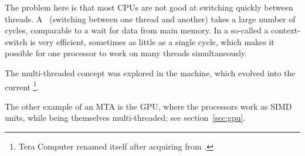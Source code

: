 The problem here is that most CPUs are not good
at switching quickly between threads. A~
(switching between one thread and another) takes a large number of
cycles, comparable to a wait for data from main memory. In a so-called
 a context-switch is very efficient, sometimes as little
as a single
cycle, which makes it possible for one processor to work on many
threads simultaneously.

The multi-threaded concept was explored in the  machine, which evolved into the current
\footnote{Tera Computer renamed itself
   after acquiring  from
  .}.

The other example of an \ac{MTA} is the \ac{GPU}, where the processors
work as \ac{SIMD} units, while being themselves multi-threaded; see
section~\ref{sec:gpu}.
